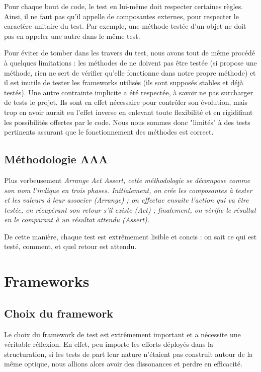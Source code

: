 \documentclass[a4paper, 12pt]{report}
\newcommand{\tech}[1]{\sf{#1}}
\newcommand{\en}[1]{\it{#1}}
\begin{document}
    Pour chaque bout de code, le test en lui-même doit respecter certaines règles. Ainsi, il ne faut pas qu'il appelle de composantes externes, pour respecter le caractère unitaire du test. Par exemple, une méthode testée d'un objet ne doit pas en appeler une autre dans le même test. 
    
    Pour éviter de tomber dans les travers du test, nous avons tout de même procédé à quelques limitations : les méthodes de \tech{Scala} ne doivent pas être testée (si \tech{Scala} propose une méthode, rien ne sert de vérifier qu'elle fonctionne dans notre propre méthode) et il est inutile de tester les frameworks utilisés (ils sont supposés stables et déjà testés). Une autre contrainte implicite a été respectée, à savoir ne pas surcharger de tests le projet. Ils sont en effet nécessaire pour contrôler son évolution, mais trop en avoir aurait eu l'effet inverse en enlevant toute flexibilité et en rigidifiant les possibilités offertes par le code. Nous nous sommes donc "limités" à des tests pertinents assurant que le fonctionnement des méthodes est correct.
    
    \section{Méthodologie AAA}
    
    Plus verbeusement \en{Arrange Act Assert}, cette méthodologie se décompose comme son nom l'indique en trois phases. Initialement, on crée les composantes à tester et les valeurs à leur associer (\en{Arrange}) ; on effectue ensuite l'action qui va être testée, en récupérant son retour s'il existe (\en{Act}) ; finalement, on vérifie le résultat en le comparant à un résultat attendu (\en{Assert}).
    
    De cette manière, chaque test est extrêmement lisible et concis : on sait ce qui est testé, comment, et quel retour est attendu.
    
    \chapter{Frameworks}
    
    \section{Choix du framework}
    Le choix du framework de test est extrêmement important et a nécessite une véritable réflexion. En effet, peu importe les efforts déployés dans la structuration, si les tests de part leur nature n'étaient pas construit autour de la même optique, nous allions alors avoir des dissonances et perdre en efficacité.
    
\end{document}
